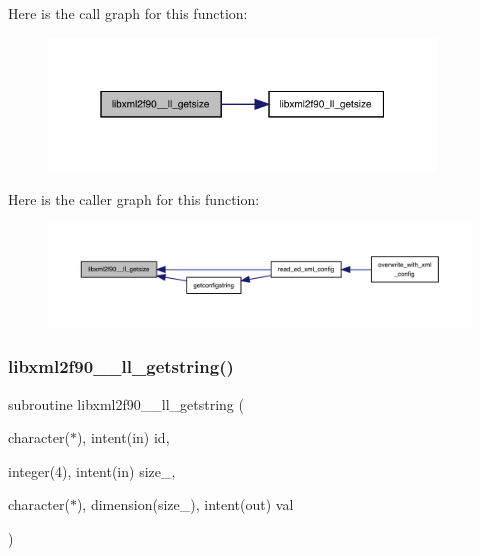 Here is the call graph for this function\+:
\nopagebreak
\begin{figure}[H]
\begin{center}
\leavevmode
\includegraphics[width=292pt]{libxml2f90_8f90__pp_8f90_a6ae6ccc230fcca3282294c098febee5a_cgraph}
\end{center}
\end{figure}
Here is the caller graph for this function\+:
\nopagebreak
\begin{figure}[H]
\begin{center}
\leavevmode
\includegraphics[width=350pt]{libxml2f90_8f90__pp_8f90_a6ae6ccc230fcca3282294c098febee5a_icgraph}
\end{center}
\end{figure}
\mbox{\label{libxml2f90_8f90__pp_8f90_ab60330c194bfbef4790a34db8f896d24}} 
\subsubsection{\texorpdfstring{libxml2f90\+\_\+\+\_\+ll\+\_\+getstring()}{libxml2f90\_\_ll\_getstring()}}
{\footnotesize\ttfamily subroutine libxml2f90\+\_\+\+\_\+ll\+\_\+getstring (\begin{DoxyParamCaption}\item[{character($\ast$), intent(in)}]{id,  }\item[{integer(4), intent(in)}]{size\+\_\+,  }\item[{character($\ast$), dimension(size\+\_\+), intent(out)}]{val }\end{DoxyParamCaption})}

